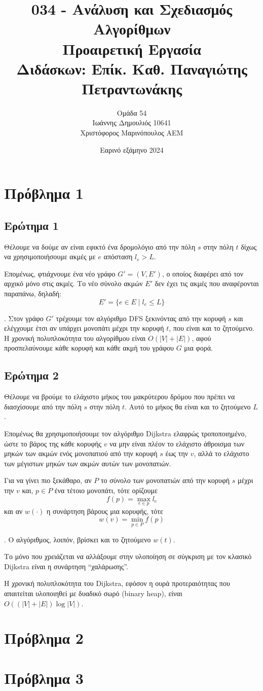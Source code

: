 \documentclass[12pt]{article}
\title{034 - Ανάλυση και Σχεδιασμός Αλγορίθμων\\ 
         Προαιρετική Εργασία \\
         \large Διδάσκων: Επίκ. Καθ. Παναγιώτης Πετραντωνάκης}
\author{Ομάδα 54 \\
        Ιωάννης Δημουλιός 10641 \\
        Χριστόφορος Μαρινόπουλος ΑΕΜ}
\date{Εαρινό εξάμηνο 2024}
\begin{document}
\maketitle

\newpage
\section*{Πρόβλημα 1}
\subsection*{Ερώτημα 1}
Θέλουμε να δούμε αν είναι εφικτό ένα δρομολόγιο από την πόλη \(s\) στην πόλη \(t\) δίχως να χρησιμοποιήσουμε ακμές με \(e\) απόσταση \(l_e > L\). 

Επομένως, φτιάχνουμε ένα νέο γράφο \(G' = (V, E')\), ο οποίος διαφέρει από τον αρχικό μόνο στις ακμές. Το νέο σύνολο ακμών \(E'\) δεν έχει τις ακμές που αναφέρονται παραπάνω, δηλαδή: 
\[
    E' = \{e \in E \mid l_e \leq L\}
\]

. Στον γράφο \(G'\) τρέχουμε τον αλγόριθμο DFS ξεκινόντας από την κορυφή \(s\) και ελέγχουμε έτσι αν υπάρχει μονοπάτι μέχρι την κορυφή \(t\), που είναι και το ζητούμενο. 
Η χρονική πολυπλοκότητα του αλγορίθμου είναι \(O(|V| + |E|)\), αφού προσπελαύνουμε κάθε κορυφή και κάθε ακμή του γράφου \(G\) μια φορά. \hfill \blacksquare

\subsection*{Ερώτημα 2}
Θέλουμε να βρούμε το ελάχιστο μήκος του μακρύτερου δρόμου που πρέπει να διασχίσουμε από την πόλη \(s\) στην πόλη \(t\). Αυτό το μήκος θα είναι και το ζητούμενο \(L\). 

Επομένως θα χρησιμοποιήσουμε τον αλγόριθμο Dijkstra ελαφρώς τροποποιημένο, ώστε το βάρος της κάθε κορυφής \(v\) να μην είναι πλέον το ελάχιστο άθροισμα των μηκών των ακμών ενός μονοπατιού από την κορυφή \(s\) έως την \(v\), αλλά το ελάχιστο των μέγιστων μηκών των ακμών αυτών των μονοπατιών. 

Για να γίνει πιο ξεκάθαρο, αν \(P\) το σύνολο των μονοπατιών από την κορυφή \(s\) μέχρι την \(v\) και, \(p \in P\) ένα τέτοιο μονοπάτι, τότε ορίζουμε
\[
    f(p) = \max_{e\in p} l_e
\]
και αν \(w(\cdot)\) η συνάρτηση βάρους μια κορυφής, τότε 
\[
    w(v) = \min_{p\in P} f(p)
\]

. O αλγόριθμος, λοιπόν, βρίσκει και το ζητούμενο \(w(t)\).

Το μόνο που χρειάζεται να αλλάξουμε στην υλοποίηση σε σύγκριση με τον κλασικό Dijkstra είναι η συνάρτηση ``χαλάρωσης''. 

Η χρονική πολυπλοκότητα του Dijkstra, εφόσον η ουρά προτεραιότητας που απαιτείται υλοποιηθεί με δυαδικό σωρό (binary heap), είναι \(O((|V| + |E|)\log |V|)\). \hfill \blacksquare 

\newpage
\section*{Πρόβλημα 2 }

\newpage
\section*{Πρόβλημα 3} 
\end{document}
